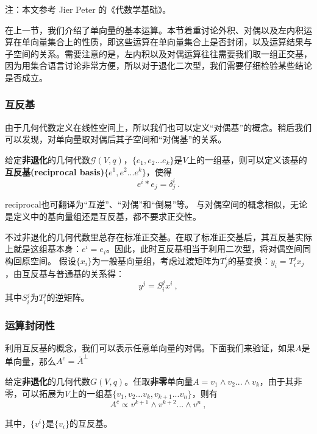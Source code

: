 

\begin{issues}
\issueTODO
\end{issues}


注：本文参考 Jier Peter 的《代数学基础》。

在上一节，我们介绍了单向量的基本运算。本节着重讨论外积、对偶以及左内积运算在单向量集合上的性质，即这些运算在单向量集合上是否封闭，以及运算结果与子空间的关系。需要注意的是，左内积以及对偶运算往往需要我们取一组正交基，因为用集合语言讨论非常方便，所以对于退化二次型，我们需要仔细检验某些结论是否成立。
\subsubsection{互反基}
由于几何代数定义在线性空间上，所以我们也可以定义“对偶基”的概念。稍后我们可以发现，对单向量取对偶后其子空间和“对偶基”的关系。

\begin{definition}{}
给定\textbf{非退化}的几何代数$\mathcal G(V,q)$，$\{e_1,e_2...e_k\}$是$V$上的一组基，则可以定义该基的\textbf{互反基(reciprocal basis)}$\{e^1,e^2...e^k\}$，使得
\begin{equation}
e^i*e_j=\delta^i_j~.
\end{equation}
\end{definition}
reciprocal也可翻译为“互逆”、“对偶”和“倒易”等。
与对偶空间的概念相似，无论是定义中的基向量组还是互反基，都不要求正交性。

不过非退化的几何代数里总存在标准正交基。在取了标准正交基后，其互反基实际上就是这组基本身：$e^i=e_i$。因此，此时互反基相当于利用二次型，将对偶空间同构回原空间。
假设$\{x_i\}$为一般基向量组，考虑过渡矩阵为$T^i_j$的基变换：$y_i=T^j_ix_j$，由互反基与普通基的关系得：
\begin{equation}
y^j=S^j_ix^i~,
\end{equation}
其中$S^j_i$为$T^j_i$的逆矩阵。

\subsubsection{运算封闭性}
利用互反基的概念，我们可以表示任意单向量的对偶。下面我们来验证，如果$A$是单向量，那么$A^c=\bar A^{\perp}$
\begin{theorem}{}\label{the_Clf05_1}
给定\textbf{非退化}的几何代数$G(V,q)$。任取\textbf{非零}单向量$A=v_1\wedge v_2...\wedge v_k$，由于其非零，可以拓展为$V$上的一组基$\{v_1,v_2...v_k,v_{k+1}...v_n\}$，则有
\begin{equation}
A^c\propto v^{k+1}\wedge v^{k+2}...\wedge v^n~,
\end{equation}
\end{theorem}
其中，$\{v^i\}$是$\{v_i\}$的互反基。

